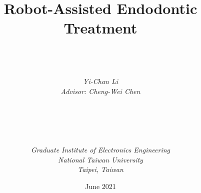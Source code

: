 \documentclass[a4paper, 12pt, twoside, openright]{mythesis}
\begin{document}
\title{\textbf{Robot-Assisted Endodontic Treatment}}

\author{ \\  \\ \\
{\it Yi-Chan Li}\\
{\it Advisor: Cheng-Wei Chen} \\ \\ \\ \\  \\ \\
{\it Graduate Institute of Electronics Engineering}\\
{\it National Taiwan University} \\
{\it Taipei, Taiwan}\\ }

{\date{June 2021}}

\maketitle

\frontmatter

\tableofcontents
\listoffigures
\listoftables


\mainmatter












\end{document}
